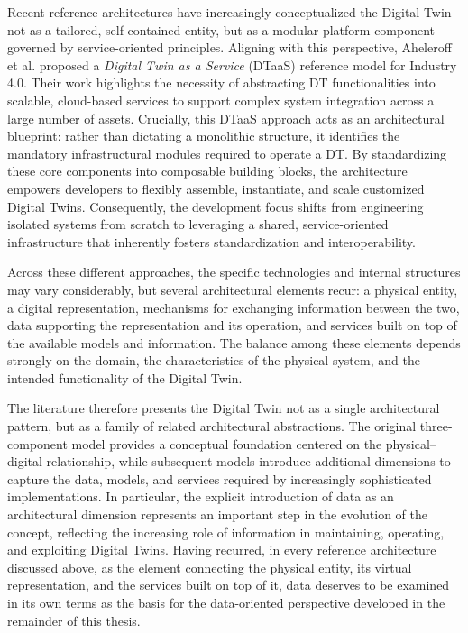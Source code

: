 Recent reference architectures have increasingly conceptualized the Digital Twin not as a tailored, self-contained entity, but as a modular platform component governed by service-oriented principles. Aligning with this perspective, Aheleroff et al. \cite{AHELEROFF2021101225} proposed a \emph{Digital Twin as a Service} (DTaaS) reference model for Industry 4.0. Their work highlights the necessity of abstracting DT functionalities into scalable, cloud-based services to support complex system integration across a large number of assets. Crucially, this DTaaS approach acts as an architectural blueprint: rather than dictating a monolithic structure, it identifies the mandatory infrastructural modules required to operate a DT. By standardizing these core components into composable building blocks, the architecture empowers developers to flexibly assemble, instantiate, and scale customized Digital Twins. Consequently, the development focus shifts from engineering isolated systems from scratch to leveraging a shared, service-oriented infrastructure that inherently fosters standardization and interoperability.

Across these different approaches, the specific technologies and internal structures may vary considerably, but several architectural elements recur: a physical entity, a digital representation, mechanisms for exchanging information between the two, data supporting the representation and its operation, and services built on top of the available models and information. The balance among these elements depends strongly on the domain, the characteristics of the physical system, and the intended functionality of the Digital Twin.

The literature therefore presents the Digital Twin not as a single architectural pattern, but as a family of related architectural abstractions. The original three-component model provides a conceptual foundation centered on the physical--digital relationship, while subsequent models introduce additional dimensions to capture the data, models, and services required by increasingly sophisticated implementations. In particular, the explicit introduction of data as an architectural dimension represents an important step in the evolution of the concept, reflecting the increasing role of information in maintaining, operating, and exploiting Digital Twins. Having recurred, in every reference architecture discussed above, as the element connecting the physical entity, its virtual representation, and the services built on top of it, data deserves to be examined in its own terms as the basis for the data-oriented perspective developed in the remainder of this thesis.

